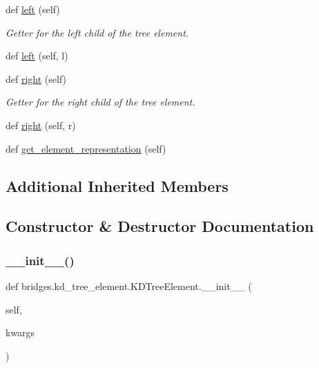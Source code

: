 \begin{DoxyCompactItemize}
def \mbox{\hyperlink{classbridges_1_1kd__tree__element_1_1_k_d_tree_element_afa4f059c61b3cd9460199c9835641db2}{left}} (self)
\begin{DoxyCompactList}\small\item\em Getter for the left child of the tree element. \end{DoxyCompactList}\item 
def \mbox{\hyperlink{classbridges_1_1kd__tree__element_1_1_k_d_tree_element_a784bad6511dae3a7c769672d2d3af14f}{left}} (self, l)
\item 
def \mbox{\hyperlink{classbridges_1_1kd__tree__element_1_1_k_d_tree_element_acbcfa46ba613daaf922d8b632b795a86}{right}} (self)
\begin{DoxyCompactList}\small\item\em Getter for the right child of the tree element. \end{DoxyCompactList}\item 
def \mbox{\hyperlink{classbridges_1_1kd__tree__element_1_1_k_d_tree_element_a89071f192bee403a44f92c86a5fdc49d}{right}} (self, r)
\item 
def \mbox{\hyperlink{classbridges_1_1kd__tree__element_1_1_k_d_tree_element_a4e08a6f2e4ff70be2b0dfd6eacdcf10e}{get\+\_\+element\+\_\+representation}} (self)
\end{DoxyCompactItemize}
\subsection*{Additional Inherited Members}


\subsection{Constructor \& Destructor Documentation}
\mbox{\label{classbridges_1_1kd__tree__element_1_1_k_d_tree_element_adf6832855ce0ca7dfe126362a704cf70}} 
\subsubsection{\texorpdfstring{\+\_\+\+\_\+init\+\_\+\+\_\+()}{\_\_init\_\_()}}
{\footnotesize\ttfamily def bridges.\+kd\+\_\+tree\+\_\+element.\+K\+D\+Tree\+Element.\+\_\+\+\_\+init\+\_\+\+\_\+ (\begin{DoxyParamCaption}\item[{}]{self,  }\item[{}]{kwargs }\end{DoxyParamCaption})}



